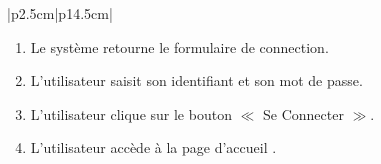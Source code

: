 \documentclass[11pt]{report}
\begin{document}
\begin{table}[h]
\begin{tabular}{|p{2.5cm}|p{14.5cm}|}
{\begin{enumerate}
      \item \begin{Large} Le système retourne le formulaire de connection.\end{Large}
      \item \begin{Large} L'utilisateur saisit son identifiant et son mot de passe.\end{Large}
      \item \begin{Large} L'utilisateur clique sur le bouton  $\ll$ Se Connecter $\gg$.\end{Large}
      \item \begin{Large} L'utilisateur accède à la page d'accueil .\end{Large}
   \end{enumerate}} \\
   \hline
    \\
   \hline
    \\
   \hline
\end{tabular}
\caption{Description textuelle du cas d'utilisation $\ll$ S'authetifier $\gg$}
\end{table}



\newpage
\end{document}
